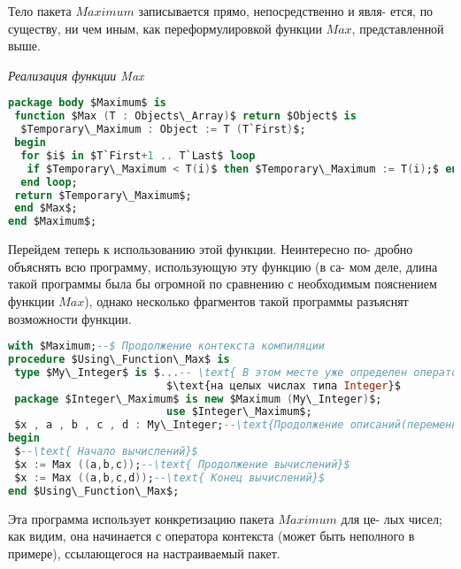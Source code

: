 Тело пакета $Maximum$ записывается прямо, непосредственно и явля­-\linebreak
ется, по существу, ни чем иным, как переформулировкой функции $Max$,\linebreak
представленной выше.
\begin{center}
\textit{Реализация функции Max}
\end{center}
\begin{lstlisting}[mathescape=true, language=Ada, xleftmargin=15pt]
package body $Maximum$ is
 function $Max (T : Objects\_Array)$ return $Object$ is
  $Temporary\_Maximum : Object := T (T`First)$;
 begin
  for $i$ in $T`First+1 .. T`Last$ loop
   if $Temporary\_Maximum < T(i)$ then $Temporary\_Maximum := T(i);$ end if;
  end loop;
 return $Temporary\_Maximum$;
 end $Max$;
end $Maximum$;
\end{lstlisting}
\hspace*{15pt}Перейдем теперь к использованию этой функции. Неинтересно по-\linebreak
дробно объяснять всю программу, использующую эту функцию (в са-\linebreak
мом деле, длина такой программы была бы огромной по сравнению с\linebreak
необходимым пояснением функции $Max$), однако несколько фрагментов\linebreak
такой программы разъяснят возможности функции.
\newpage
\begin{lstlisting}[mathescape=true, language=Ada, frame=none, xleftmargin=15pt]
with $Maximum;--$ Продолжение контекста компиляции
procedure $Using\_Function\_Max$ is
 type $My\_Integer$ is $...-- \text{ В этом месте уже определен оператор "<"}$
                         $\text{на целых числах типа Integer}$
 package $Integer\_Maximum$ is new $Maximum (My\_Integer)$;
                         use $Integer\_Maximum$;
 $x , a , b , c , d : My\_Integer;--\text{Продолжение описаний(переменные ...)}$
begin
 $--\text{ Начало вычислений}$
 $x := Max ((a,b,c));--\text{ Продолжение вычислений}$
 $x := Max ((a,b,c,d));--\text{ Конец вычислений}$
end $Using\_Function\_Max$;
\end{lstlisting}
\hspace*{15pt}Эта программа использует конкретизацию пакета $Maximum$ для це-\linebreak
лых чисел; как видим, она начинается с оператора контекста (может\linebreak
быть неполного в примере), ссылающегося на настраиваемый пакет.\linebreak
